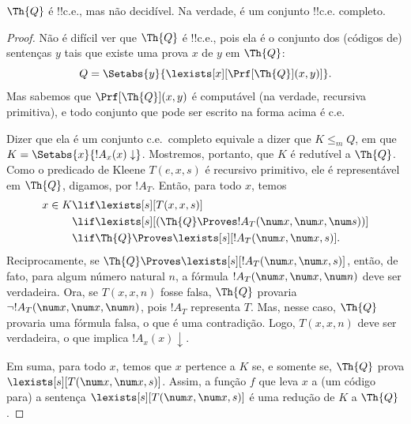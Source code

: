 \documentclass[../../../include/open-logic-section]{subfiles}
\begin{document}



\begin{thm}
$\Th{Q}$ é !!{c.e.}, mas não decidível. Na verdade, é um conjunto
  !!{c.e.} completo.
\end{thm}

\begin{proof}
Não é difícil ver que $\Th{Q}$ é !!{c.e.}, pois ela é o conjunto dos
(códigos de) sentenças $y$ tais que existe uma prova $x$ de $y$ em
$\Th{Q}$:
\[
Q = \Setabs{y}{\lexists[x][\Prf[\Th{Q}](x,y)]}.
\]
Mas sabemos que $\Prf[\Th{Q}](x,y)$ é computável (na verdade, recursiva
primitiva), e todo conjunto que pode ser escrito na forma acima é c.e.

Dizer que ela é um conjunto c.e.\ completo equivale a dizer que
$K \leq_m Q$, em que $K = \Setabs{x}{!A_x(x) \downarrow}$. Mostremos,
portanto, que $K$ é redutível a $\Th{Q}$. Como o predicado de Kleene
$T(e,x,s)$ é recursivo primitivo, ele é representável em $\Th{Q}$,
digamos, por $!A_T$. Então, para todo $x$, temos
\begin{align*}
x \in K & \lif \lexists[s][T(x,x,s)] \\
& \lif \lexists[s][(\Th{Q} \Proves !A_T(\num x,\num x, \num s))]
  \\
& \lif \Th{Q} \Proves \lexists[s][!A_T(\num x, \num x, s)].
\end{align*}
Reciprocamente, se $\Th{Q} \Proves
\lexists[s][!A_T(\num x, \num x, s)]$, então, de fato, para algum
número natural $n$, a fórmula $!A_T(\num x, \num x, \num n)$ deve ser
verdadeira. Ora, se $T(x,x,n)$ fosse falsa, $\Th{Q}$ provaria
$\lnot !A_T(\num x, \num x, \num n)$, pois $!A_T$ representa $T$.
Mas, nesse caso, $\Th{Q}$ provaria uma fórmula falsa, o que é uma
contradição. Logo, $T(x,x,n)$ deve ser verdadeira, o que implica
$!A_x(x) \downarrow$.

Em suma, para todo $x$, temos que $x$ pertence a $K$ se, e somente se,
$\Th{Q}$ prova $\lexists[s][T(\num x,\num x,s)]$. Assim, a função $f$
que leva $x$ a (um código para) a sentença $\lexists[s][T(\num x,
  \num x, s)]$ é uma redução de $K$ a $\Th{Q}$.
\end{proof}
\end{document}
